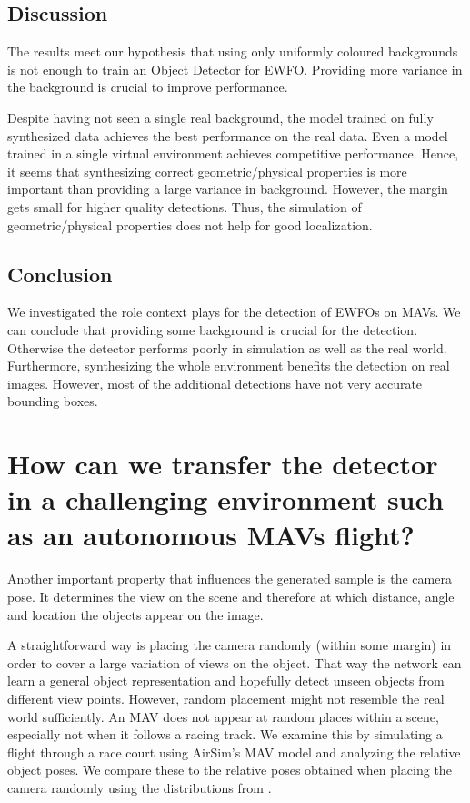 \subsection{Discussion}

The results meet our hypothesis that using only uniformly coloured backgrounds is not enough to train an Object Detector for \ac{EWFO}. Providing more variance in the background is crucial to improve performance.

Despite having not seen a single real background, the model trained on fully synthesized data achieves the best performance on the real data. Even a model trained in a single virtual environment achieves competitive performance. Hence, it seems that synthesizing correct geometric/physical properties is more important than providing a large variance in background. However, the margin gets small for higher quality detections. Thus, the simulation of geometric/physical properties does not help for good localization.

\subsection{Conclusion}

We investigated the role context plays for the detection of \acp{EWFO} on \acp{MAV}. We can conclude that providing some background is crucial for the detection. Otherwise the detector performs poorly in simulation as well as the real world. Furthermore, synthesizing the whole environment benefits the detection on real images. However, most of the additional detections have not very accurate bounding boxes.

\section{How can we transfer the detector in a challenging environment such as an autonomous \acp{MAV} flight?}

Another important property that influences the generated sample is the camera pose. It determines the view on the scene and therefore at which distance, angle and location the objects appear on the image.

A straightforward way is placing the camera randomly (within some margin) in order to cover a large variation of views on the object. That way the network can learn a general object representation and hopefully detect unseen objects from different view points. However, random  placement might not resemble the real world sufficiently. An \ac{MAV} does not appear at random places within a scene, especially not when it follows a racing track. We examine this by simulating a flight through a race court using AirSim's \ac{MAV} model and analyzing the relative object poses. We compare these to the relative poses obtained when placing the camera randomly using the distributions from .

